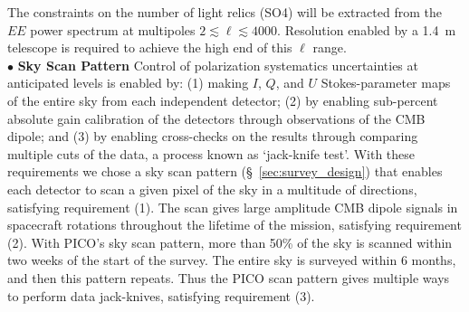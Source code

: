 \documentclass[PICOReport.tex]{subfiles}
\begin{document}
The constraints on the number of light relics (SO4) will be extracted from the $EE$ power spectrum at multipoles $2 \lesssim \ell \lesssim 4000$. Resolution enabled by a 1.4~m telescope is required to achieve the high end of this $\ell$ range.  \\
%
$\bullet$ {\bf Sky Scan Pattern} \hspace{0.1in} 
Control of polarization systematics uncertainties at anticipated levels is enabled by: (1) making $I$, $Q$, and $U$ Stokes-parameter maps of the entire sky from each independent detector; (2) by enabling sub-percent absolute gain calibration of the detectors through observations of the CMB dipole; and (3) by enabling cross-checks on the results through comparing multiple cuts of the data, a process known as `jack-knife test'.   With these requirements we chose a sky scan pattern (\S~\ref{sec:survey_design}) that enables each detector to scan a given pixel of the sky in a multitude of directions, satisfying requirement (1). The scan gives large amplitude CMB dipole signals in spacecraft rotations throughout the lifetime of the mission, satisfying requirement (2). With PICO's sky scan pattern, more than 50\% of the sky is  scanned within two weeks of the start of the survey. The entire sky is surveyed within 6 months, and then this pattern repeats. Thus the PICO scan pattern gives multiple ways to perform data jack-knives, satisfying requirement (3).   

 
\end{document}
